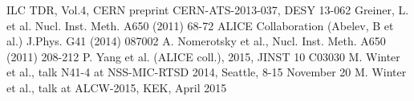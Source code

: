 \documentclass[11pt,a4paper,twosided]{article}
\begin{document}
\begin{thebibliography}{8}
 ILC TDR, Vol.4, CERN preprint CERN-ATS-2013-037, DESY 13-062 
 Greiner, L. et al. Nucl. Inst. Meth. A650 (2011) 68-72 
 ALICE Collaboration (Abelev, B et al.) 
                   J.Phys. G41 (2014) 087002 
 A. Nomerotsky et al., Nucl. Inst. Meth. A650 (2011) 208-212
 P. Yang et al. (ALICE coll.), 2015, JINST 10 C03030
 M. Winter et al., talk N41-4 at NSS-MIC-RTSD 2014, Seattle, 8-15 November 20
 M. Winter et al., talk at ALCW-2015, KEK, April 2015
\end{thebibliography}
\end{document}
